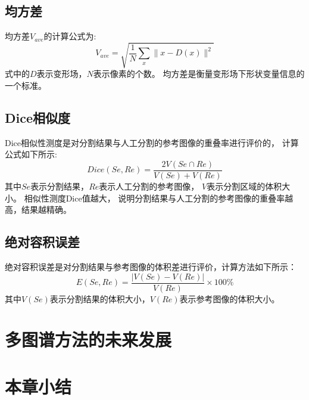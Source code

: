 \subsection{均方差}
均方差$V_{ave}$的计算公式为:
\begin{equation}
  V_{ave}=\sqrt{\frac{1}{N}\sum_x\lVert x-D(x)\rVert^2}
\end{equation}
式中的$D$表示变形场，$N$表示像素的个数。
均方差是衡量变形场下形状变量信息的一个标准。
\subsection{Dice相似度}
Dice相似性测度是对分割结果与人工分割的参考图像的重叠率进行评价的，
计算公式如下所示:
\begin{equation}
  Dice(Se,Re)=\frac{2V(Se\cap Re)}{V(Se)+V(Re)}
\end{equation}
其中$Se$表示分割结果，$Re$表示人工分割的参考图像，
$V$表示分割区域的体积大小。
相似性测度Dice值越大，
说明分割结果与人工分割的参考图像的重叠率越高，结果越精确。
\subsection{绝对容积误差}
绝对容积误差是对分割结果与参考图像的体积差进行评价，计算方法如下所示：
\begin{equation}
  E(Se,Re)=\frac{\lvert V(Se)-V(Re)\rvert}{V(Re)}\times 100\%
\end{equation}
其中$V(Se)$表示分割结果的体积大小，$V(Re)$表示参考图像的体积大小。

\section{多图谱方法的未来发展}

\section{本章小结}
